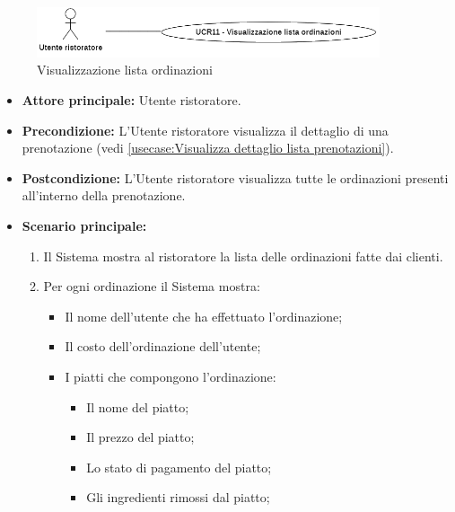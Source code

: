 \label{usecase:Visualizzazione lista ordinazioni}

\begin{figure}[h]
	\centering
	\includegraphics[width=0.9\textwidth]{./uml/UCR11.png} 
	\caption{Visualizzazione lista ordinazioni}
	\label{fig:UCR11}
  \end{figure}

\begin{itemize}
	\item \textbf{Attore principale:} Utente ristoratore.

	\item \textbf{Precondizione:} L'Utente ristoratore visualizza il dettaglio di una prenotazione (vedi \autoref{usecase:Visualizza dettaglio lista prenotazioni}).

	\item \textbf{Postcondizione:} L'Utente ristoratore visualizza tutte le
	      ordinazioni presenti all'interno della prenotazione.

	\item \textbf{Scenario principale:}
	      \begin{enumerate}
		      \item Il Sistema mostra al ristoratore la lista delle ordinazioni fatte dai clienti.

				\item Per ogni ordinazione il Sistema mostra:
					\begin{itemize}
						\item Il nome dell'utente che ha effettuato
							l'ordinazione;
						\item Il costo dell'ordinazione dell'utente;
						\item I piatti che compongono l'ordinazione:
							\begin{itemize}
								\item Il nome del piatto;
								\item Il prezzo del piatto;
								\item Lo stato di pagamento del piatto;
								\item Gli ingredienti rimossi dal piatto;
							\end{itemize}
					\end{itemize}
	      \end{enumerate}
\end{itemize}

